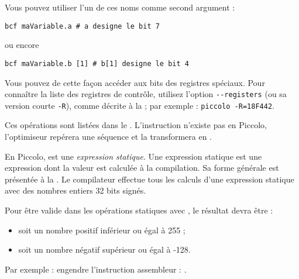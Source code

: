 Vous pouvez utiliser l’un de ces noms comme second argument :
\begin{lstlisting}[language=piccolo]
bcf maVariable.a # a designe le bit 7
\end{lstlisting}
ou encore
\begin{lstlisting}[language=piccolo]
bcf maVariable.b [1] # b[1] designe le bit 4
\end{lstlisting}

Vous pouvez de cette façon accéder aux bits des registres spéciaux. Pour connaître la liste des registres de contrôle, utilisez l’option \texttt{-{}-registers} (ou sa version courte \texttt{-R}), comme décrite à la  ; par exemple : \texttt{piccolo -R=18F442}.



Ces opérations sont listées dans le . L’instruction  n’existe pas en Piccolo, l’optimiseur repérera une séquence  et la transformera en .

En Piccolo,  est une \emph{expression statique}. Une expression statique est une expression dont la valeur est calculée à la compilation. Sa forme générale est présentée à la . Le compilateur effectue tous les calculs d'une expression statique avec des nombres entiers 32 bits signés.

Pour être valide dans les opérations statiques avec , le résultat devra être :
\begin{itemize}
  \item soit un nombre positif inférieur ou égal à 255 ;
  \item soit un nombre négatif supérieur ou égal à -128.
\end{itemize}

Par exemple :  engendre l’instruction assembleur : .


